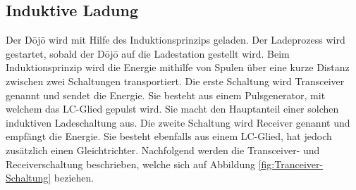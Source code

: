 \subsection{Induktive Ladung}\label{sec:energieuebertragung}

Der Dōjō wird mit Hilfe des Induktionsprinzips geladen. Der Ladeprozess wird gestartet, sobald der Dōjō auf die Ladestation gestellt wird. Beim Induktionsprinzip wird die Energie mithilfe von Spulen über eine kurze Distanz zwischen zwei Schaltungen transportiert. Die erste Schaltung wird Transceiver genannt und sendet die Energie. Sie besteht aus einem Pulsgenerator, mit welchem das LC-Glied gepulst wird. Sie macht den Hauptanteil einer solchen induktiven Ladeschaltung aus. Die zweite Schaltung wird Receiver genannt und empfängt die Energie. Sie besteht ebenfalls aus einem LC-Glied, hat jedoch zusätzlich einen Gleichtrichter. Nachfolgend werden die Transceiver- und Receiverschaltung beschrieben, welche sich auf Abbildung \ref{fig:Tranceiver-Schaltung} beziehen.


